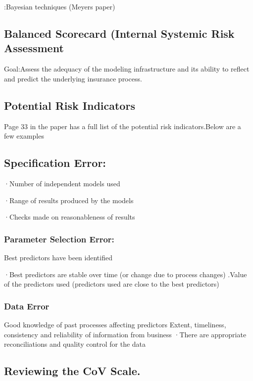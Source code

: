 \documentclass[
]{article}
\begin{document}
:Bayesian techniques (Meyers paper)

\subsection{Balanced Scorecard (Internal Systemic Risk
Assessment}\label{balanced-scorecard-internal-systemic-risk-assessment}

Goal:Assess the adequacy of the modeling infrastructure and its ability
to reflect and predict the underlying insurance process.

\subsection{Potential Risk Indicators}\label{potential-risk-indicators}

Page 33 in the paper has a full list of the potential risk
indicators.Below are a few examples

\subsection{Specification Error:}\label{specification-error}

·Number of independent models used

·Range of results produced by the models

·Checks made on reasonableness of results

\subsubsection{Parameter Selection
Error:}\label{parameter-selection-error}

Best predictors have been identified

·Best predictors are stable over time (or change due to process changes)
.Value of the predictors used (predictors used are close to the best
predictors)

\subsubsection{Data Error}\label{data-error}

Good knowledge of past processes affecting predictors Extent,
timeliness, consistency and reliability of information from business
·There are appropriate reconciliations and quality control for the data

\subsection{Reviewing the CoV Scale.}\label{reviewing-the-cov-scale.}
\end{document}
